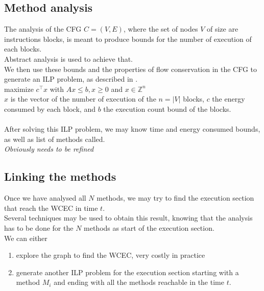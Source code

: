 \documentclass{article}
\begin{document}
\subsection*{Method analysis}
The analysis of the CFG $C=(V,E)$, where the set of nodes $V$ of size are instructions blocks, is meant to produce bounds for the number of execution of each blocks.\\
Abstract analysis is used to achieve that.\\
We then use these bounds and the properties of flow conservation in the CFG to generate an ILP problem, as described in \cite{li_performance_nodate}.\\
maximize $c^\intercal x$ with $Ax \leq b, x \geq 0$ and $x\in \mathbb{Z}^n$\\
$x$ is the vector of the number of execution of the  $n= \lvert V \rvert $ blocks, $c$ the energy consumed by each block, and $b$ the execution count bound of the blocks.\\\\
After solving this ILP problem, we may know time and energy consumed bounds, as well as list of methods called.\\
\emph{Obviously needs to be refined}
\subsection*{Linking the methods}
Once we have analysed all $N$ methods, we may try to find the execution section that reach the WCEC in time $t$.\\
Several techniques may be used to obtain this result, knowing that the analysis has to be done for the $N$ methods as start of the execution section.\\
We can either 
\begin{enumerate}
    \item explore the graph to find the WCEC, very costly in practice
    \item generate another ILP problem for the execution section starting with a method $M_i$ and ending with all the methods reachable in the time $t$.
\end{enumerate} 
 
\end{document}
